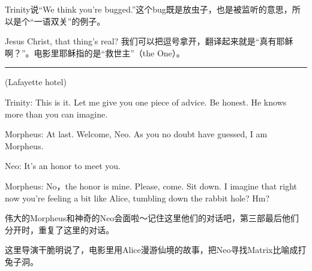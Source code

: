 \documentclass{ctexart}
\newcommand{\myparsep}{\noindent \rule[0.5ex]{\linewidth}{1pt}}
\newenvironment{myquote}{\color{green} \setlength{\leftskip}{6em} \setlength{\rightskip}{4em} \setlength{\parindent}{-2em}}{\par}
\begin{document}
Trinity说“We think you're bugged.”这个bug既是放虫子，也是被监听的意思，所以是个“一语双关”的例子。

Jesus Christ, that thing's real? 我们可以把逗号拿开，翻译起来就是“真有耶稣啊？”。电影里耶稣指的是“救世主”（the One）。

\myparsep

\begin{myquote}
(Lafayette hotel)

Trinity: This is it. Let me give you one piece of advice. Be honest. He knows more than you can imagine.

Morpheus: At last. Welcome, Neo. As you no doubt have guessed, I am Morpheus.

Neo: It's an honor to meet you.

Morpheus: No，the honor is mine. Please, come. Sit down. I imagine that right now you're feeling a bit like Alice, tumbling down the rabbit hole? Hm?
\end{myquote}

伟大的Morpheus和神奇的Neo会面啦～记住这里他们的对话吧，第三部最后他们分开时，重复了这里的对话。

这里导演干脆明说了，电影里用Alice漫游仙境的故事，把Neo寻找Matrix比喻成打兔子洞。
\end{document}
